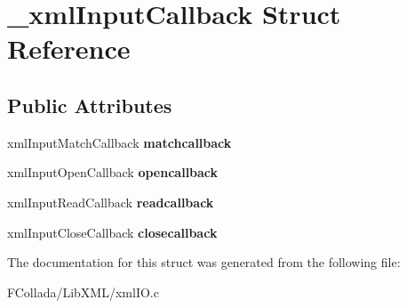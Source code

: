 \hypertarget{struct__xmlInputCallback}{
\section{\_\-xmlInputCallback Struct Reference}
\label{struct__xmlInputCallback}
}
\subsection*{Public Attributes}
\begin{DoxyCompactItemize}
\item 
\hypertarget{struct__xmlInputCallback_a96b605c2612fe41dfbb1792477c36ed0}{
xmlInputMatchCallback {\bfseries matchcallback}}
\label{struct__xmlInputCallback_a96b605c2612fe41dfbb1792477c36ed0}

\item 
\hypertarget{struct__xmlInputCallback_af9bc5e46ce910da957db4ad94bd2c4ba}{
xmlInputOpenCallback {\bfseries opencallback}}
\label{struct__xmlInputCallback_af9bc5e46ce910da957db4ad94bd2c4ba}

\item 
\hypertarget{struct__xmlInputCallback_a70cbb71d862fd2c87cbced963b9a9505}{
xmlInputReadCallback {\bfseries readcallback}}
\label{struct__xmlInputCallback_a70cbb71d862fd2c87cbced963b9a9505}

\item 
\hypertarget{struct__xmlInputCallback_a70f45e9e8435e21100495c444c3e7fe7}{
xmlInputCloseCallback {\bfseries closecallback}}
\label{struct__xmlInputCallback_a70f45e9e8435e21100495c444c3e7fe7}

\end{DoxyCompactItemize}


The documentation for this struct was generated from the following file:\begin{DoxyCompactItemize}
\item 
FCollada/LibXML/xmlIO.c\end{DoxyCompactItemize}

